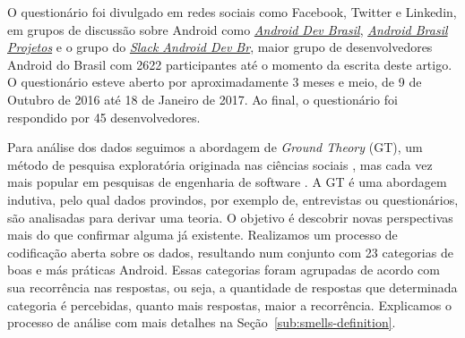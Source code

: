 O questionário foi divulgado em redes sociais como Facebook, Twitter e Linkedin, em grupos de discussão sobre Android como \href{https://groups.google.com/forum/#!forum/androidbrasil-dev}{\textit{Android Dev Brasil}}, \href{https://groups.google.com/forum/\#!forum/android-brasil--projetos}{\textit{Android Brasil Projetos}} e o grupo do \href{http://slack.androiddevbr.org/}{\textit{Slack Android Dev Br}}, maior grupo de desenvolvedores Android do Brasil com 2622 participantes até o momento da escrita deste artigo. 
O questionário esteve aberto por aproximadamente 3 meses e meio, de 9 de Outubro de 2016 até 18 de Janeiro de 2017. 
Ao final, o questionário foi respondido por 45 desenvolvedores. 

Para análise dos dados seguimos a abordagem de \textit{Ground Theory} (GT), um método de pesquisa exploratória originada nas ciências sociais \cite{Strauss2007, GlaserStrauss1999}, mas cada vez mais popular em pesquisas de engenharia de software \cite{Adolph2011}. A GT é uma abordagem indutiva, pelo qual dados provindos, por exemplo de, entrevistas ou questionários, são analisadas para derivar uma teoria. O objetivo é descobrir novas perspectivas mais do que confirmar alguma já existente.
Realizamos um processo de codificação aberta sobre os dados, resultando num conjunto com 23 categorias de boas e más práticas Android. Essas categorias foram agrupadas de acordo com sua recorrência nas respostas, ou seja, a quantidade de respostas que determinada categoria é percebidas, quanto mais respostas, maior a recorrência.
Explicamos o processo de análise com mais detalhes na Seção~\ref{sub:smells-definition}.





